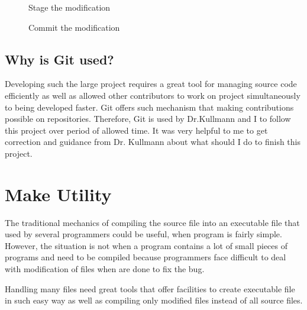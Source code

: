 \documentclass[11pt]{report}
\begin{document}
\begin{figure}[h]
\begin{center}
{\label{fig:gitstage}}
\caption{Stage the modification}
\caption{Commit the modification}
\end{center}
\end{figure}


\subsection{Why is Git used?}
\label{subsec: why git}
Developing such the large project requires a great tool for managing source code efficiently as well as allowed other contributors to work on project simultaneously to being developed faster. Git offers such mechanism that making contributions possible on repositories. Therefore, Git is used by Dr.Kullmann and I to follow this project over period of allowed time. It was very helpful to me to get correction and guidance from Dr. Kullmann about what should I do to finish this project.

\section{Make Utility}
\label{sec: Make}
The traditional mechanics of compiling the source file into an executable file that used by several programmers could be useful, when program is fairly simple. However, the situation is not when a program contains a lot of small pieces of programs and need to be compiled because programmers face difficult to deal with modification of files when are done to fix the bug.

Handling many files need great tools that offer facilities to create executable file in such easy way as well as compiling only modified files instead of all source files.
\end{document}
